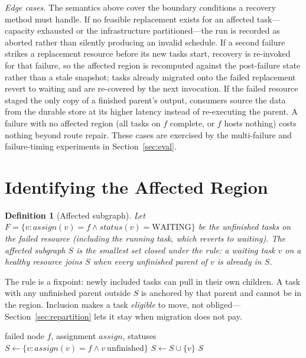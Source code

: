 \documentclass[conference]{IEEEtran}
\newtheorem{definition}{Definition}
\theoremstyle{remark}
\begin{document}
\emph{Edge cases.} The semantics above cover the boundary conditions a
recovery method must handle. If no feasible replacement exists for an
affected task---capacity exhausted or the infrastructure partitioned---the
run is recorded as aborted rather than silently producing an invalid
schedule. If a second failure strikes a replacement resource before its new
tasks start, recovery is re-invoked for that failure, so the affected region
is recomputed against the post-failure state rather than a stale snapshot;
tasks already migrated onto the failed replacement revert to waiting and are
re-covered by the next invocation. If the failed resource staged the only
copy of a finished parent's output, consumers source the data from the
durable store at its higher latency instead of re-executing the parent. A
failure with no affected region (all tasks on $f$ complete, or $f$ hosts
nothing) costs nothing beyond route repair. These cases are exercised by
the multi-failure and failure-timing experiments in
Section~\ref{sec:eval}.

\section{Identifying the Affected Region}
\label{sec:affected}

\begin{definition}[Affected subgraph]
Let $F = \{v : \mathit{assign}(v)=f \land \mathit{status}(v)=\text{WAITING}\}$
be the unfinished tasks on the failed resource (including the running task,
which reverts to waiting). The affected subgraph $S$ is the smallest set
closed under the rule: a waiting task $v$ on a healthy resource joins $S$
when \emph{every} unfinished parent of $v$ is already in $S$.
\end{definition}

The rule is a fixpoint: newly included tasks can pull in their own children.
A task with any unfinished parent outside $S$ is anchored by that parent and
cannot be in the region. Inclusion makes a task \emph{eligible} to move, not
obliged---Section~\ref{sec:repartition} lets it stay when migration does not
pay.

\begin{algorithm}
\caption{Affected-region extraction}
\label{alg:boundary}
\begin{algorithmic}[1]
\REQUIRE failed node $f$, assignment $\mathit{assign}$, statuses
\STATE $S \gets \{v : \mathit{assign}(v)=f \land v\ \text{unfinished}\}$
\REPEAT
      \STATE $S \gets S \cup \{v\}$
    \ENDIF
  \ENDFOR
{}
\RETURN $S$
\end{algorithmic}
\end{algorithm}
\end{document}
